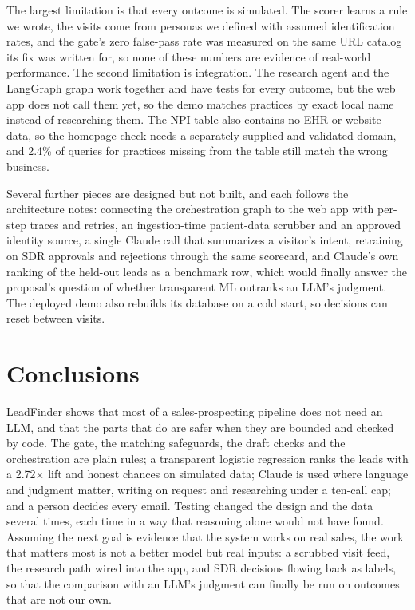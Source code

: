 \documentclass[11pt]{article}
\begin{document}
The largest limitation is that every outcome is simulated. The scorer learns a rule we wrote, the visits come from personas we defined with assumed identification rates, and the gate's zero false-pass rate was measured on the same URL catalog its fix was written for, so none of these numbers are evidence of real-world performance. The second limitation is integration. The research agent and the LangGraph graph work together and have tests for every outcome, but the web app does not call them yet, so the demo matches practices by exact local name instead of researching them. The NPI table also contains no EHR or website data, so the homepage check needs a separately supplied and validated domain, and 2.4\% of queries for practices missing from the table still match the wrong business.

Several further pieces are designed but not built, and each follows the architecture notes: connecting the orchestration graph to the web app with per-step traces and retries, an ingestion-time patient-data scrubber and an approved identity source, a single Claude call that summarizes a visitor's intent, retraining on SDR approvals and rejections through the same scorecard, and Claude's own ranking of the held-out leads as a benchmark row, which would finally answer the proposal's question of whether transparent ML outranks an LLM's judgment. The deployed demo also rebuilds its database on a cold start, so decisions can reset between visits.

\section{Conclusions}

LeadFinder shows that most of a sales-prospecting pipeline does not need an LLM, and that the parts that do are safer when they are bounded and checked by code. The gate, the matching safeguards, the draft checks and the orchestration are plain rules; a transparent logistic regression ranks the leads with a 2.72$\times$ lift and honest chances on simulated data; Claude is used where language and judgment matter, writing on request and researching under a ten-call cap; and a person decides every email. Testing changed the design and the data several times, each time in a way that reasoning alone would not have found. Assuming the next goal is evidence that the system works on real sales, the work that matters most is not a better model but real inputs: a scrubbed visit feed, the research path wired into the app, and SDR decisions flowing back as labels, so that the comparison with an LLM's judgment can finally be run on outcomes that are not our own.
\end{document}
